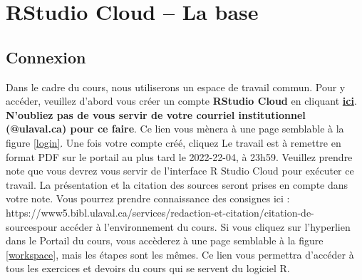 \documentclass[10.5pt,a4paper]{article}
\begin{document}
\section{RStudio Cloud -- La base}
  \subsection{Connexion}
  Dans le cadre du cours, nous utiliserons un espace de travail commun. Pour y accéder, veuillez d'abord vous créer un compte \textbf{RStudio Cloud} en cliquant \href{https://login.rstudio.cloud/register?redirect=https\%3A\%2F\%2Fclient.login.rstudio.cloud\%2Foauth\%2Flogin\%3Fshow_auth\%3D0\%26show_login\%3D0\%26show_setup\%3D0}{\textbf{ici}}. \textbf{N'oubliez pas de vous servir de votre courriel institutionnel (@ulaval.ca) pour ce faire}. Ce lien vous mènera à une page semblable à la figure \ref{login}. Une fois votre compte créé, cliquez  Le travail est à remettre en format PDF sur le portail au plus tard le 2022-22-04, à 23h59. Veuillez prendre note que vous devrez vous servir de l'interface R Studio Cloud pour exécuter ce travail. La présentation et la citation des sources seront prises en compte dans votre note. Vous pourrez prendre connaissance des consignes ici :  https://www5.bibl.ulaval.ca/services/redaction-et-citation/citation-de-sourcespour accéder à l'environnement du cours. Si vous cliquez sur l’hyperlien dans le Portail du cours, vous accèderez à une page semblable à la figure \ref{workspace}, mais les étapes sont les mêmes. Ce lien vous permettra d'accéder à tous les exercices et devoirs du cours qui se servent du logiciel R.
  
  
  
\end{document}
